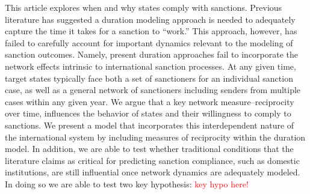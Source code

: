 This article explores when and why states comply with sanctions. Previous literature has suggested a duration modeling approach is needed to adequately capture the time it takes for a sanction to ``work.'' This approach, however, has failed to carefully account for important dynamics relevant to the modeling of sanction outcomes. Namely, present duration approaches fail to incorporate the network effects intrinsic to international sanction processes. At any given time, target states typically face both a set of sanctioners for an individual sanction case, as well as a general network of sanctioners including senders from multiple cases within any given year. We argue that a key network measure--reciprocity over time, influences the behavior of states and their willingness to comply to sanctions. We present a model that incorporates this interdependent nature of the international system by including measures of reciprocity within the duration model. In addition, we are able to test whether traditional conditions that the literature claims as critical for predicting sanction compliance, such as domestic institutions, are still influential once network dynamics are adequately modeled. In doing so we are able to test two key hypothesis: \textcolor{red}{key hypo here!}